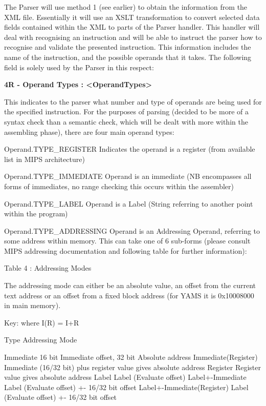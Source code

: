\documentclass[12pt]{report}
\begin{document}
The Parser will use method 1 (see earlier) to obtain the information from the XML file. Essentially it will use an XSLT transformation to convert selected data fields contained within the XML to parts of the Parser handler. This handler will deal with recognising an instruction and will be able to instruct the parser how to recognise and validate the presented instruction. This information includes the name of the instruction, and the possible operands that it takes. The following field is solely used by the Parser in this respect:

\textbf{4R - Operand Types : <OperandTypes>}

This indicates to the parser what number and type of operands are being used for the specified instruction. For the purposes of parsing (decided to be more of a syntax check than a semantic check, which will be dealt with more within the assembling phase), there are four main operand types:

\begin{list}

\item[Operand.TYPE_REGISTER]
Indicates the operand is a register (from available list in MIPS architecture)
\item[Operand.TYPE_IMMEDIATE]
Operand is an immediate (NB encompasses all forms of immediates, no range checking this occurs within the assembler)
\item[Operand.TYPE_LABEL]
Operand is a Label (String referring to another point within the program)
\item[Operand.TYPE_ADDRESSING]
Operand is an Addressing Operand, referring to some address within memory. This can take one of 6 sub-forms (please consult MIPS addressing documentation and following table for further information):

\end{list}

Table 4 : Addressing Modes

The addressing mode can either be an absolute value, an offset from the current text address or an offset from a fixed block address (for YAMS it is 0x10008000 in main memory).

Key: where I(R) = I+R

Type				Addressing Mode

Immediate			16 bit Immediate offset, 32 bit Absolute address
Immediate(Register)		Immediate (16/32 bit) plus register value gives absolute address
Register			Register value gives absolute address
Label				Label (Evaluate offset)
Label+-Immediate		Label (Evaluate offset) +- 16/32 bit offset
Label+-Immediate(Register)	Label (Evaluate offset) +- 16/32 bit offset
\end{document}
